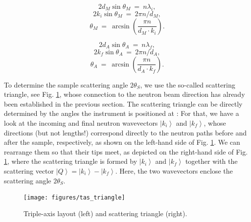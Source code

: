 \begin{minipage}{0.45\textwidth}
	\centering
	\begin{equation} 2 d_{M}\sin \theta_{M} \ =\  n \lambda_{i}, \end{equation}
	\begin{equation} 2 k_{i} \sin \theta_{M} \ =\  2 \pi n / d_{M}, \end{equation}
	\begin{equation} \boxed{ \theta_{M} \ =\  \arcsin \left( \frac{\pi n}{d_{M} \cdot k_{i}} \right). } \end{equation}
\end{minipage}
\begin{minipage}{0.45\textwidth}
	\centering
	\begin{equation} 2 d_{A}\sin \theta_{A} \ =\  n \lambda_{f}, \end{equation}
	\begin{equation} 2 k_{f} \sin \theta_{A} \ =\  2 \pi n / d_{A}, \end{equation}
	\begin{equation} \boxed{ \theta_{A} \ =\  \arcsin \left( \frac{\pi n}{d_{A} \cdot k_{f}} \right). } \end{equation}
\end{minipage}

\vspace{0.5cm}

To determine the sample scattering angle $2 \theta_S$, we use the so-called scattering triangle, see 
Fig. \ref{fig:scattering_triangle}, whose connection to the neutron beam direction has already 
been established in the previous section.
The scattering triangle can be directly determined by the angles the instrument is positioned at \cite[pp. 14-15]{Shirane2002}: 
For that, we have a look at the incoming and final neutron wavevectors $\left| k_i \right>$ and $\left| k_f \right>$, 
whose directions (but not lengths!) correspond directly to the neutron paths before and after the sample, 
respectively, as shown on the left-hand side of Fig. \ref{fig:scattering_triangle}. We can rearrange them so 
that their tips meet, as depicted on the right-hand side of Fig. \ref{fig:scattering_triangle}, where the 
scattering triangle is formed by $\left| k_i \right>$ and $\left| k_f \right>$ together with the
scattering vector $\left| Q \right> = \left| k_i \right> - \left| k_f \right>$.
Here, the two wavevectors enclose the scattering angle $2 \theta_S$.

\begin{figure}
	\begin{center}
		\texttt{[image: figures/tas\_triangle]}
	\end{center}
	\caption[TAS layout and scattering triangle.]{
		Triple-axis layout (left) and scattering triangle (right). \label{fig:scattering_triangle}}
\end{figure}

